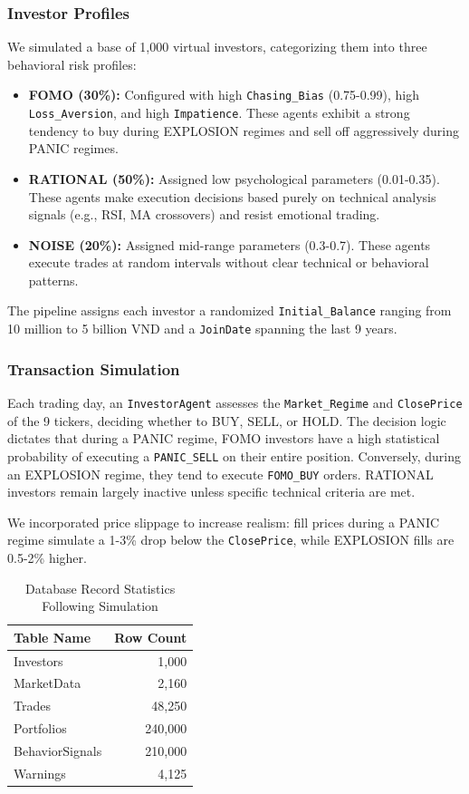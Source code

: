 \subsubsection{Investor Profiles}
We simulated a base of 1,000 virtual investors, categorizing them into three behavioral risk profiles:
\begin{itemize}
    \item \textbf{FOMO (30\%):} Configured with high \texttt{Chasing\_Bias} (0.75-0.99), high \texttt{Loss\_Aversion}, and high \texttt{Impatience}. These agents exhibit a strong tendency to buy during EXPLOSION regimes and sell off aggressively during PANIC regimes.
    \item \textbf{RATIONAL (50\%):} Assigned low psychological parameters (0.01-0.35). These agents make execution decisions based purely on technical analysis signals (e.g., RSI, MA crossovers) and resist emotional trading.
    \item \textbf{NOISE (20\%):} Assigned mid-range parameters (0.3-0.7). These agents execute trades at random intervals without clear technical or behavioral patterns.
\end{itemize}
The pipeline assigns each investor a randomized \texttt{Initial\_Balance} ranging from 10 million to 5 billion VND and a \texttt{JoinDate} spanning the last 9 years.

\subsubsection{Transaction Simulation}
Each trading day, an \texttt{InvestorAgent} assesses the \texttt{Market\_Regime} and \texttt{ClosePrice} of the 9 tickers, deciding whether to BUY, SELL, or HOLD. The decision logic dictates that during a PANIC regime, FOMO investors have a high statistical probability of executing a \texttt{PANIC\_SELL} on their entire position. Conversely, during an EXPLOSION regime, they tend to execute \texttt{FOMO\_BUY} orders. RATIONAL investors remain largely inactive unless specific technical criteria are met.

We incorporated price slippage to increase realism: fill prices during a PANIC regime simulate a 1-3\% drop below the \texttt{ClosePrice}, while EXPLOSION fills are 0.5-2\% higher.

\begin{table}[h!]
\centering
\begin{tabular}{|l|r|}
\hline
\textbf{Table Name} & \textbf{Row Count} \\ \hline
Investors & 1,000 \\ \hline
MarketData & 2,160 \\ \hline
Trades & 48,250 \\ \hline
Portfolios & 240,000 \\ \hline
BehaviorSignals & 210,000 \\ \hline
Warnings & 4,125 \\ \hline
\end{tabular}
\caption{Database Record Statistics Following Simulation}
\end{table}

